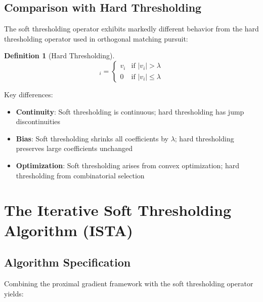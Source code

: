 \documentclass[12pt]{article}
\renewcommand{\vec}[1]{\mathbf{#1}}
\newcommand{\abs}[1]{\lvert #1 \rvert}
\theoremstyle{definition}
\newtheorem{definition}{Definition}[section]
\begin{document}
\subsection{Comparison with Hard Thresholding}

The soft thresholding operator exhibits markedly different behavior from the hard thresholding operator used in orthogonal matching pursuit:

\begin{definition}[Hard Thresholding]
    \begin{equation}
        [\text{hard}_\lambda(\vec{v})]_i = \begin{cases}
            v_i & \text{if } \abs{v_i} > \lambda    \\
            0   & \text{if } \abs{v_i} \leq \lambda
        \end{cases}
    \end{equation}
\end{definition}

Key differences:
\begin{itemize}[leftmargin=*]
    \item \textbf{Continuity}: Soft thresholding is continuous; hard thresholding has jump discontinuities
    \item \textbf{Bias}: Soft thresholding shrinks all coefficients by $\lambda$; hard thresholding preserves large coefficients unchanged
    \item \textbf{Optimization}: Soft thresholding arises from convex optimization; hard thresholding from combinatorial selection
\end{itemize}

\newpage
\section{The Iterative Soft Thresholding Algorithm (ISTA)}

\subsection{Algorithm Specification}

Combining the proximal gradient framework with the soft thresholding operator yields:
\end{document}
